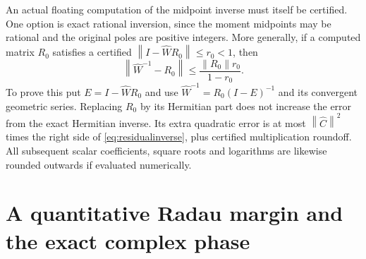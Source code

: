 \documentclass[11pt]{article}
\newcommand{\norm}[1]{\left\lVert#1\right\rVert}
\begin{document}
An actual floating computation of the midpoint inverse must itself
be certified. One option is exact rational inversion, since the
moment midpoints may be rational and the original poles are positive
integers. More generally, if a computed matrix $R_0$ satisfies a
certified $\norm{I-\widehat W R_0}\le r_0<1$, then
\begin{equation}\label{eq:residualinverse}
 \norm{\widehat W^{-1}-R_0}
 \le\frac{\norm{R_0}r_0}{1-r_0}.
\end{equation}
To prove this put $E=I-\widehat W R_0$ and use
$\widehat W^{-1}=R_0(I-E)^{-1}$ and its convergent geometric
series. Replacing $R_0$ by its Hermitian part does not increase
the error from the exact Hermitian inverse. Its extra quadratic
error is at most $\norm{\widehat C}^2$ times the right side of
\eqref{eq:residualinverse}, plus certified multiplication roundoff.
All subsequent scalar coefficients, square roots and logarithms are
likewise rounded outwards if evaluated numerically.

\section{A quantitative Radau margin and the exact complex phase}
\end{document}
